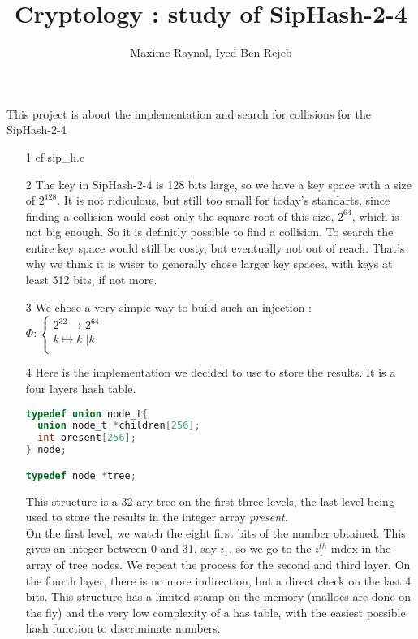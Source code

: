 \documentclass{article}
\title{Cryptology : study of SipHash-2-4}
\author{Maxime Raynal, Iyed Ben Rejeb}
\begin{document}
\maketitle


This project is about the implementation and search for collisions for the SipHash-2-4

\begin{itemize}
\item[1] cf sip\_h.c

\item[2] The key in SipHash-2-4 is 128 bits large, so we have a key space with a size of $2^{128}$. It is not ridiculous, but still too small for today's standarts, since finding a collision would cost only the square root of this size, $2^{64}$, which is not big enough. So it is definitly possible to find a collision. 
To search the entire key space would still be costy, but eventually not out of reach. That's why we think it is wiser to generally chose larger key spaces, with keys at least 512 bits, if not more.

\item[3] We chose a very simple way to build such an injection : \\
$\Phi : \begin{cases}
	2^{32} \rightarrow 2^{64}\\
	k \mapsto k || k\\
		\end{cases}$

\item[4] Here is the implementation we decided to use to store the results. It is a four layers hash table. 

\begin{lstlisting}[language = C]
typedef union node_t{
  union node_t *children[256];
  int present[256];
} node;

typedef node *tree;
\end{lstlisting}

This structure is a 32-ary tree on the first three levels, the last level being used to store the results in the integer array \textit{present}.\\
On the first level, we watch the eight first bits of the number obtained. This gives an integer between 0 and 31, say $i_1$, so we go to the $i_1^{th}$ index in the array of tree nodes. We repeat the process for the second and third layer. On the fourth layer, there is no more indirection, but a direct check on the last 4 bits.
This structure has a limited stamp on the memory (mallocs are done on the fly) and the very low complexity of a has table, with the easiest possible hash function to discriminate numbers.


\end{itemize}
\end{document}
